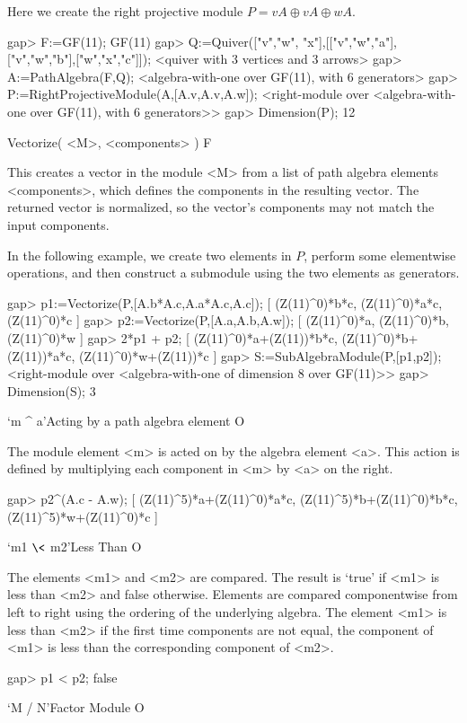 Here we create
the right projective module 
$P = vA \oplus vA \oplus wA$.

\beginexample
gap> F:=GF(11);
GF(11)
gap> Q:=Quiver(["v","w", "x"],[["v","w","a"],["v","w","b"],["w","x","c"]]);
<quiver with 3 vertices and 3 arrows>
gap> A:=PathAlgebra(F,Q);
<algebra-with-one over GF(11), with 6 generators>
gap> P:=RightProjectiveModule(A,[A.v,A.v,A.w]);
<right-module over <algebra-with-one over GF(11), with 6 generators>>
gap> Dimension(P);
12
\endexample

\>Vectorize( <M>, <components> ) F

This creates a vector
in the module <M>
from a list
of path algebra elements <components>,
which defines the components
in the resulting vector.
The returned vector
is normalized,
so the vector's components
may not match
the input components.

In the following example,
we create two elements in $P$,
perform some elementwise operations,
and then construct
a submodule using the two elements
as generators.

\beginexample
gap> p1:=Vectorize(P,[A.b*A.c,A.a*A.c,A.c]);
[ (Z(11)^0)*b*c, (Z(11)^0)*a*c, (Z(11)^0)*c ]
gap> p2:=Vectorize(P,[A.a,A.b,A.w]);
[ (Z(11)^0)*a, (Z(11)^0)*b, (Z(11)^0)*w ]
gap> 2*p1 + p2;
[ (Z(11)^0)*a+(Z(11))*b*c, (Z(11)^0)*b+(Z(11))*a*c, (Z(11)^0)*w+(Z(11))*c ]
gap> S:=SubAlgebraModule(P,[p1,p2]);
<right-module over <algebra-with-one of dimension 8 over GF(11)>>
gap> Dimension(S);
3
\endexample

\>`m ^ a'{Acting by a path algebra element} O

The module element <m> is acted on
by the algebra element <a>.
This action is defined
by multiplying each component
in <m> by <a> on the right.

\beginexample
gap> p2^(A.c - A.w);
[ (Z(11)^5)*a+(Z(11)^0)*a*c, (Z(11)^5)*b+(Z(11)^0)*b*c, 
  (Z(11)^5)*w+(Z(11)^0)*c ]
\endexample

\>`m1 $\<$ m2'{Less Than} O

The elements <m1> and <m2> are compared.
The result is `true' if <m1> is less than <m2>
and false otherwise.
Elements are compared
componentwise
from left
to right
using the ordering
of the underlying algebra.
The element <m1>
is less than <m2>
if the first time components
are not equal,
the component of <m1>
is less than the corresponding component
of <m2>.

\beginexample
gap> p1 < p2;
false
\endexample

\> `M / N'{Factor Module} O

